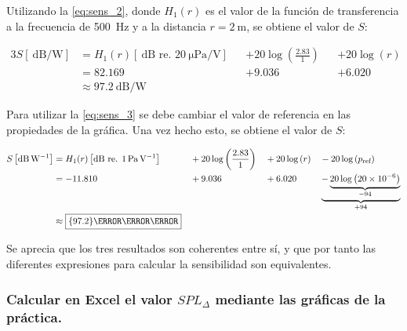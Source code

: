 \documentclass[10pt]{article}
\begin{document}
Utilizando la \autoref{eq:sens_2}, donde $H_1(r)$ es el valor de la función de transferencia a la frecuencia de \SI{500}{\Hz} y a la distancia $r=\qty{2}{\meter}$, se obtiene el valor de $S$:

\begin{alignat*}{3}
  S \left[ \SI{}{\dB\per\watt} \right] & = H_1(r) \left[ \SI{}{\dB}\text{ re. }\SI{20}{\micro\pascal\per\volt} \right] &  & + 20 \log \left( \frac{2.83}{1} \right) &  & + 20 \log \left( r \right) \\
                                       & = 82.169                                                                      &  & + 9.036                                 &  & + \num{6.020}              \\
                                       & \approx \boxed{\qty{97.2}{\dB\per\watt}}                                      &  &                                         &  &
\end{alignat*}

Para utilizar la \autoref{eq:sens_3} se debe cambiar el valor de referencia en las propiedades de la gráfica. Una vez hecho esto, se obtiene el valor de $S$:

\begin{alignat*}{4}
  S \left[ \SI{}{\dB\per\watt} \right] & = H_1(r) \left[ \SI{}{\dB}\text{ re. }\SI{1}{\pascal\per\volt} \right] &  & + 20 \log \left( \frac{2.83}{1} \right) &  & + 20 \log \left( r \right) &  & - 20 \log \left( p _{\textnormal{ref}} \right)                                         \\
                                       & = -11.810                                                              &  & + 9.036                                 &  & + \num{6.020}              &  & \underbrace{- \underbrace{20 \log \left( \num{20e-6} \right)}_{\num{-94}}}_{+\num{94}} \\
                                       & \approx \boxed{\qty{97.2}{\dB\per\watt}}                               &  &                                         &  &                            &  &
\end{alignat*}

Se aprecia que los tres resultados son coherentes entre sí, y que por tanto las diferentes expresiones para calcular la sensibilidad son equivalentes.

\subsubsection{\texorpdfstring{Calcular en Excel el valor $SPL_{\Delta}$ mediante las gráficas de la práctica.}{Pregunta 3}}
\end{document}
